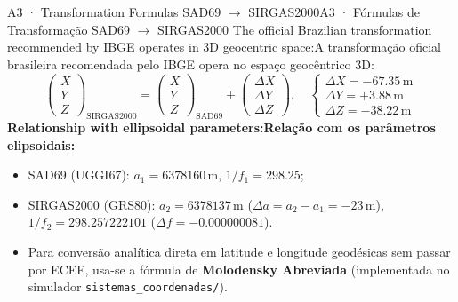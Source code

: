 \documentclass[aspectratio=169,11pt]{beamer}
\newcommand{\tr}[2]{\ifEN#2\else#1\fi}
\begin{document}
\begin{frame}{\tr{A3 · Fórmulas de Transformação SAD69 $\to$ SIRGAS2000}{A3 · Transformation Formulas SAD69 $\to$ SIRGAS2000}}
  \scriptsize
  \tr{A transformação oficial brasileira recomendada pelo IBGE opera no espaço geocêntrico 3D:}{The
  official Brazilian transformation recommended by IBGE operates in 3D geocentric space:}
  \begin{equation*}
    \begin{pmatrix} X \\ Y \\ Z \end{pmatrix}_{\text{SIRGAS2000}} =
    \begin{pmatrix} X \\ Y \\ Z \end{pmatrix}_{\text{SAD69}} +
    \begin{pmatrix} \Delta X \\ \Delta Y \\ \Delta Z \end{pmatrix}, \quad
    \begin{cases}
      \Delta X = -\num{67.35}\,\mathrm{m} \\
      \Delta Y = +\num{3.88}\,\mathrm{m} \\
      \Delta Z = -\num{38.22}\,\mathrm{m}
    \end{cases}
  \end{equation*}
  \vspace{0.1cm}
  \tr{\textbf{Relação com os parâmetros elipsoidais:}}{ \textbf{Relationship with ellipsoidal parameters:}}
  \begin{itemize}
    \tiny
    \item SAD69 (UGGI67): $a_1 = \num{6378160}$\,m, $1/f_1 = \num{298.25}$;
    \item SIRGAS2000 (GRS80): $a_2 = \num{6378137}$\,m ($\Delta a = a_2 - a_1 = -\num{23}$\,m), $1/f_2 = \num{298.257222101}$ ($\Delta f = -\num{0.000000081}$).
    \item Para conversão analítica direta em latitude e longitude geodésicas sem passar por ECEF, usa-se a fórmula de \textbf{Molodensky Abreviada} (implementada no simulador \texttt{sistemas\_coordenadas/}).
  \end{itemize}
\end{frame}
\end{document}
